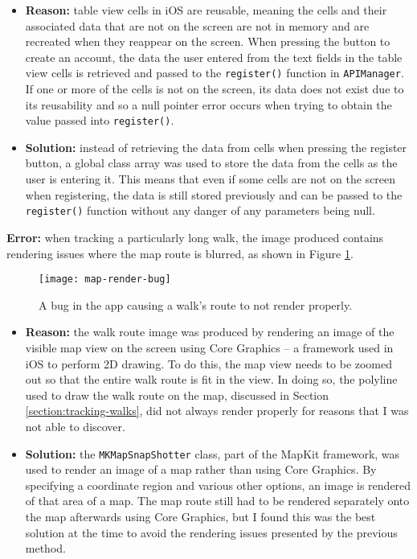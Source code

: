 \begin{itemize}
  \item \textbf{Reason:} table view cells in iOS are reusable, meaning the cells and their associated data that are not on the screen are not in memory and are recreated when they reappear on the screen. When pressing the button to create an account, the data the user entered from the text fields in the table view cells is retrieved and passed to the \verb|register()| function in \verb|APIManager|. If one or more of the cells is not on the screen, its data does not exist due to its reusability and so a null pointer error occurs when trying to obtain the value passed into \verb|register()|.
  
  \item \textbf{Solution:} instead of retrieving the data from cells when pressing the register button, a global class array was used to store the data from the cells as the user is entering it. This means that even if some cells are not on the screen when registering, the data is still stored previously and can be passed to the \verb|register()| function without any danger of any parameters being null.
\end{itemize}
  
\noindent \textbf{Error:} when tracking a particularly long walk, the image produced contains rendering issues where the map route is blurred, as shown in Figure \ref{fig:map-render-bug}.

\begin{figure}[hbt]
  \centering
  \texttt{[image: map-render-bug]}
  \caption{A bug in the app causing a walk's route to not render properly.}
  \label{fig:map-render-bug}
\end{figure}


\begin{itemize}
  \item \textbf{Reason:} the walk route image was produced by rendering an image of the visible map view on the screen using Core Graphics -- a framework used in iOS to perform 2D drawing. To do this, the map view needs to be zoomed out so that the entire walk route is fit in the view. In doing so, the polyline used to draw the walk route on the map, discussed in Section \ref{section:tracking-walks}, did not always render properly for reasons that I was not able to discover.
  
  \item \textbf{Solution:} the \verb|MKMapSnapShotter| class, part of the MapKit framework, was used to render an image of a map rather than using Core Graphics. By specifying a coordinate region and various other options, an image is rendered of that area of a map. The map route still had to be rendered separately onto the map afterwards using Core Graphics, but I found this was the best solution at the time to avoid the rendering issues presented by the previous method.
\end{itemize}

